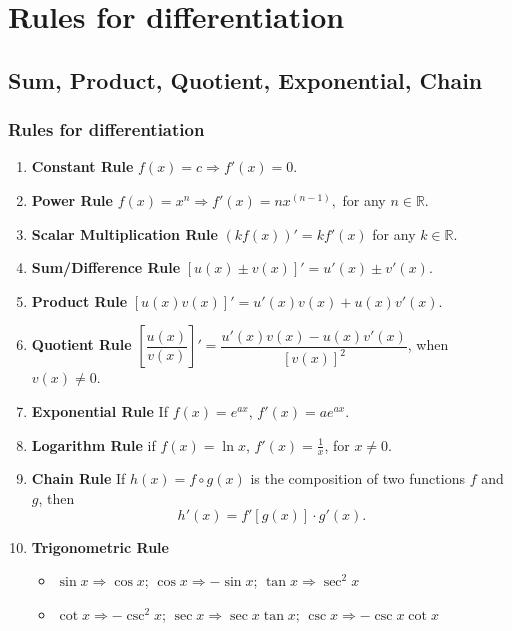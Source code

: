 \documentclass[t]{beamer}
\theoremstyle{plain}
\theoremstyle{definition}
\begin{document}
\section{Rules for differentiation}

\subsection{Sum, Product, Quotient, Exponential, Chain}

\frame
{
\footnotesize
\frametitle{Rules for differentiation}
\label{tues}
\begin{enumerate}
\item \textbf{Constant Rule}  $f(x) = c \Rightarrow   f'(x) = 0.$\\  
\item \textbf{Power Rule}  $f(x) = x^n    \Rightarrow   f'(x) = nx^{(n-1)},$  for any  $n\in \mathbb{R}$.\\  
\item \textbf{Scalar Multiplication Rule} $ (kf(x))' = kf'(x)$ for any $k\in \mathbb{R}$.\\  
\item \textbf{Sum/Difference Rule}  $[u(x)\pm v(x)]' = u'(x) \pm v'(x).$\\  
\item \textbf{Product Rule} $[u(x)v(x)]' = u'(x)v(x) + u(x)v'(x)$.\\  
\item \textbf{Quotient Rule} $\left[\dfrac{u(x)}{v(x)} \right]'= \dfrac{ u'(x)v(x) - u(x)v'(x)}{[v(x)]^2}$, when $v(x)\neq 0$. \\    
\item {\bf Exponential Rule} If $f(x)=e^{ax}$, $f'(x)=ae^{ax}$. \\  
\item {\bf Logarithm Rule} if $f(x)=\ln x$, $f'(x)=\frac{1}{x}$, for $x\neq 0$. 
\item \textbf{Chain Rule} If $h(x)=f\circ g(x)$ is the composition of two functions $f$ and $g$, then 
\[
h'(x) = f'[g(x)]\cdot g'(x).
\]
\item \textbf{Trigonometric Rule} 
\begin{itemize}
	\item $\sin{x} \Rightarrow \cos{x}$; $\cos{x} \Rightarrow-\sin{x}$; $\tan{x} \Rightarrow \sec^2{x}$
	\item $\cot{x} \Rightarrow -\csc^2{x}$; $\sec{x} \Rightarrow \sec{x}\tan{x}$; $\csc{x} \Rightarrow -\csc{x}\cot{x}$
\end{itemize}

\end{enumerate}
}
\end{document}
